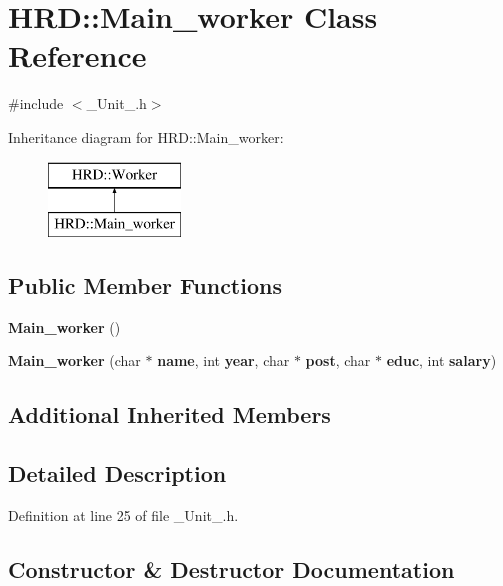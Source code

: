 \section{H\+RD\+:\+:Main\+\_\+worker Class Reference}
\label{class_h_r_d_1_1_main__worker}


{\ttfamily \#include $<$\+\_\+\+Unit\+\_\+.\+h$>$}

Inheritance diagram for H\+RD\+:\+:Main\+\_\+worker\+:\begin{figure}[H]
\begin{center}
\leavevmode
\includegraphics[height=2.000000cm]{class_h_r_d_1_1_main__worker}
\end{center}
\end{figure}
\subsection*{Public Member Functions}
\begin{DoxyCompactItemize}
\item 
\textbf{ Main\+\_\+worker} ()
\item 
\textbf{ Main\+\_\+worker} (char $\ast$\textbf{ name}, int \textbf{ year}, char $\ast$\textbf{ post}, char $\ast$\textbf{ educ}, int \textbf{ salary})
\end{DoxyCompactItemize}
\subsection*{Additional Inherited Members}


\subsection{Detailed Description}


Definition at line 25 of file \+\_\+\+Unit\+\_\+.\+h.



\subsection{Constructor \& Destructor Documentation}
\mbox{\label{class_h_r_d_1_1_main__worker_aa9100bfcf5c63371f8109c5bbaf81243}} 
